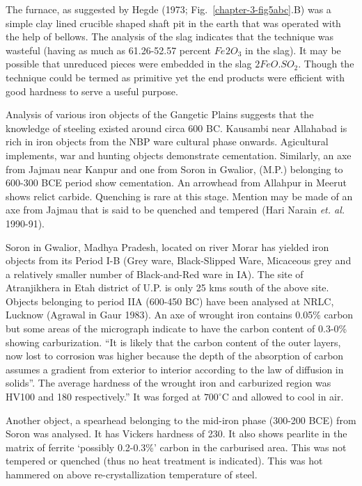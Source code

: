 The furnace, as suggested by Hegde (1973; Fig.~\ref{chapter-3-fig5abc}.B) was a simple clay lined crucible shaped shaft pit in the earth that was operated with the help of bellows. The analysis of the slag indicates that the technique was wasteful (having as much as 61.26-52.57 percent $Fe_­­­­2O_3$ in the slag). It may be possible that unreduced pieces were embedded in the slag $2FeO. SO_2$. Though the technique could be termed as primitive yet the end products were efficient with good hardness to serve a useful purpose. 

Analysis of various iron objects of the Gangetic Plains suggests that the knowledge of steeling existed around circa 600 BC. Kausambi near Allahabad is rich in iron objects from the NBP ware cultural phase onwards. Agicultural implements, war and hunting objects demonstrate cementation. Similarly, an axe from Jajmau near Kanpur and one from Soron in Gwalior, (M.P.) belonging to 600-300 BCE period show cementation. An arrowhead from Allahpur in Meerut shows relict carbide. Quenching is rare at this stage. Mention may be made of an axe from Jajmau that is said to be quenched and tempered (Hari Narain {\it et. al.} 1990-91). 

Soron in Gwalior, Madhya Pradesh, located on river Morar has yielded iron objects from its Period I-B (Grey ware, Black-Slipped Ware, Micaceous grey and a relatively smaller number of Black-and-Red ware in IA). The site of Atranjikhera in Etah district of U.P. is only 25 kms south of the above site. Objects belonging to period IIA (600-450 BC) have been analysed at NRLC, Lucknow (Agrawal in Gaur 1983). An axe of wrought iron contains 0.05\% carbon but some areas of the micrograph indicate to have the carbon content of 0.3-0\% showing carburization. “It is likely that the carbon content of the outer layers, now lost to corrosion was higher because the depth of the absorption of carbon assumes a gradient from exterior to interior according to the law of diffusion in solids”. The average hardness of the wrought iron and carburized region was HV100 and 180 respectively.” It was forged at $700^\circ$C and allowed to cool in air. 


Another object, a spearhead belonging to the mid-iron phase (300-200 BCE) from Soron was analysed. It has Vickers hardness of 230. It also shows pearlite in the matrix of ferrite ‘possibly 0.2-0.3\%’ carbon in the carburised area. This was not tempered or quenched (thus no heat treatment is indicated). This was hot hammered on above re-crystallization temperature of steel. 


